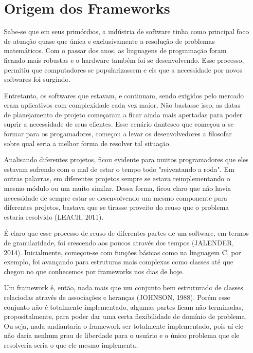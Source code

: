\documentclass[
    12pt,       %
    openright,      %
    twoside,      %
    a4paper,      %
    english,      %
    french,       %
    spanish,      %
    brazil,       %
    ]{abntex2}
\begin{document}
      \section{Origem dos Frameworks}
          Sabe-se que em seus primórdios, a indústria de software tinha como principal
          foco de atuação quase que única e exclusivamente a resolução de problemas
          matemáticos. Com o passar dos anos, as linguagens de programação
          foram ficando mais robustas e o hardware também foi se desenvolvendo. Esse
          processo, permitiu que computadores se popularizassem e eis que a necessidade
          por novos softwares foi surgindo.

          Entretanto, os softwares que estavam, e continuam, sendo exigidos pelo
          mercado eram aplicativos com complexidade cada vez maior. Não bastasse isso,
          as datas de planejamento de projeto começaram a ficar ainda mais apertadas
          para poder suprir a necessidade de seus clientes. Esse cenário dantesco
          que começou a se formar para os progamadores, começou a levar os desenvolvedores
          a filosofar sobre qual seria a melhor forma de resolver tal situação.

          Analisando diferentes projetos, ficou evidente para muitos programadores
          que eles estavam sofrendo com o mal de estar o tempo todo "reiventando
          a roda". Em outras palavras, em diferentes projetos sempre se estava
          reimplementando o mesmo módulo ou um muito similar. Dessa forma, ficou
          claro que não havia necessidade de sempre estar se desenvolvendo um mesmo
          componente para diferentes projetos, bastava que se tirasse proveito do reuso
          que o problema estaria resolvido (LEACH, 2011).

          É claro que esse processo de reuso de diferentes partes de um software,
          em termos de granularidade, foi crescendo aos poucos através dos tempos (JALENDER, 2014).
          Inicialmente, começou-se com funções básicas como na linguagem C, por exemplo,
          foi avançando para estruturas mais complexas como classes até que chegou
          no que conhecemos por frameworks nos dias de hoje.

          Um framework é, então, nada mais que um conjunto bem estruturado de classes
          relaciodas através de associações e heranças (JOHNSON, 1988). Porém esse conjunto não
          é totalmente implementado, algumas partes ficam não terminadas, propositalmente,
          para poder dar uma certa flexibilidade de domínio de problema. Ou seja, nada
          andiantaria o framework ser totalmente implementado, pois
          aí ele não daria nenhum grau de liberdade para o usuário e o único problema
          que ele resolveria seria o que ele mesmo implementa.
\end{document}
